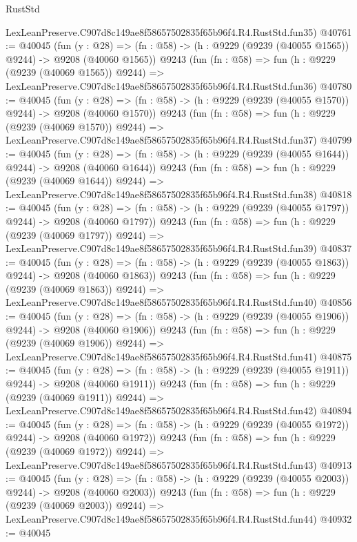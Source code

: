 \begin{lexlean}{RustStd}
\begin{coremodule}
    LexLeanPreserve.C907d8c149ae8f58657502835f65b96f4.R4.RustStd.fun35)
@40761 := @40045
    (fun (y : @28) =>
    (fn : @58) -> (h : @9229 (@9239 (@40055 @1565)) @9244) -> @9208 (@40060 @1565))
    @9243
    (fun (fn : @58) =>
    fun (h : @9229 (@9239 (@40069 @1565)) @9244) =>
    LexLeanPreserve.C907d8c149ae8f58657502835f65b96f4.R4.RustStd.fun36)
@40780 := @40045
    (fun (y : @28) =>
    (fn : @58) -> (h : @9229 (@9239 (@40055 @1570)) @9244) -> @9208 (@40060 @1570))
    @9243
    (fun (fn : @58) =>
    fun (h : @9229 (@9239 (@40069 @1570)) @9244) =>
    LexLeanPreserve.C907d8c149ae8f58657502835f65b96f4.R4.RustStd.fun37)
@40799 := @40045
    (fun (y : @28) =>
    (fn : @58) -> (h : @9229 (@9239 (@40055 @1644)) @9244) -> @9208 (@40060 @1644))
    @9243
    (fun (fn : @58) =>
    fun (h : @9229 (@9239 (@40069 @1644)) @9244) =>
    LexLeanPreserve.C907d8c149ae8f58657502835f65b96f4.R4.RustStd.fun38)
@40818 := @40045
    (fun (y : @28) =>
    (fn : @58) -> (h : @9229 (@9239 (@40055 @1797)) @9244) -> @9208 (@40060 @1797))
    @9243
    (fun (fn : @58) =>
    fun (h : @9229 (@9239 (@40069 @1797)) @9244) =>
    LexLeanPreserve.C907d8c149ae8f58657502835f65b96f4.R4.RustStd.fun39)
@40837 := @40045
    (fun (y : @28) =>
    (fn : @58) -> (h : @9229 (@9239 (@40055 @1863)) @9244) -> @9208 (@40060 @1863))
    @9243
    (fun (fn : @58) =>
    fun (h : @9229 (@9239 (@40069 @1863)) @9244) =>
    LexLeanPreserve.C907d8c149ae8f58657502835f65b96f4.R4.RustStd.fun40)
@40856 := @40045
    (fun (y : @28) =>
    (fn : @58) -> (h : @9229 (@9239 (@40055 @1906)) @9244) -> @9208 (@40060 @1906))
    @9243
    (fun (fn : @58) =>
    fun (h : @9229 (@9239 (@40069 @1906)) @9244) =>
    LexLeanPreserve.C907d8c149ae8f58657502835f65b96f4.R4.RustStd.fun41)
@40875 := @40045
    (fun (y : @28) =>
    (fn : @58) -> (h : @9229 (@9239 (@40055 @1911)) @9244) -> @9208 (@40060 @1911))
    @9243
    (fun (fn : @58) =>
    fun (h : @9229 (@9239 (@40069 @1911)) @9244) =>
    LexLeanPreserve.C907d8c149ae8f58657502835f65b96f4.R4.RustStd.fun42)
@40894 := @40045
    (fun (y : @28) =>
    (fn : @58) -> (h : @9229 (@9239 (@40055 @1972)) @9244) -> @9208 (@40060 @1972))
    @9243
    (fun (fn : @58) =>
    fun (h : @9229 (@9239 (@40069 @1972)) @9244) =>
    LexLeanPreserve.C907d8c149ae8f58657502835f65b96f4.R4.RustStd.fun43)
@40913 := @40045
    (fun (y : @28) =>
    (fn : @58) -> (h : @9229 (@9239 (@40055 @2003)) @9244) -> @9208 (@40060 @2003))
    @9243
    (fun (fn : @58) =>
    fun (h : @9229 (@9239 (@40069 @2003)) @9244) =>
    LexLeanPreserve.C907d8c149ae8f58657502835f65b96f4.R4.RustStd.fun44)
@40932 := @40045

\end{coremodule}
\end{lexlean}

